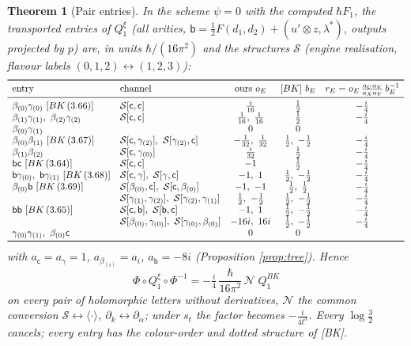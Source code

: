 \documentclass[11pt]{article}
\newtheorem{theorem}{Theorem}
\theoremstyle{definition}
\newcommand{\Qx}{Q^{\xi}}
\begin{document}
\begin{theorem}[Pair entries]\label{thm:main}
In the scheme $\psi=0$ with the computed $\hbar F_1$, the transported entries of $\Qx_1$ (all arities, $\mathsf b=\tfrac12F(d_1,d_2)+(u'\otimes z,\lambda^*)$, outputs projected by $p$) are, in units $\hbar/(16\pi^2)$ and the structures $\mathcal S$ (engine realisation, flavour labels $(0,1,2)\leftrightarrow(1,2,3)$):
\[
\begin{array}{llccc}
\toprule
\text{entry}&\text{channel}&\text{ours }o_E&[BK]\ b_E&r_E=o_E\,\frac{a_Ua_V}{a_Xa_Y}\,b_E^{-1}\\\midrule
\beta_{(0)}\gamma_{(0)}\ [BK\,(3.66)]&\mathcal S[\mathsf c,\mathsf c]&\tfrac i{16}&\tfrac12&-\tfrac i4\\
\beta_{(1)}\gamma_{(1)},\ \beta_{(2)}\gamma_{(2)}&\mathcal S[\mathsf c,\mathsf c]&\tfrac1{16},\ \tfrac1{16}&\tfrac12&-\tfrac i4\\
\beta_{(0)}\gamma_{(1)}&&0&0&\\
\beta_{(0)}\beta_{(1)}\ [BK\,(3.67)]&\mathcal S[\mathsf c,\gamma_{(2)}],\ \mathcal S[\gamma_{(2)},\mathsf c]&-\tfrac1{32},\ \tfrac1{32}&\tfrac12,\ -\tfrac12&-\tfrac i4\\
\beta_{(1)}\beta_{(2)}&\mathcal S[\mathsf c,\gamma_{(0)}]&\tfrac i{32}&\tfrac12&-\tfrac i4\\
\mathsf b\mathsf c\ [BK\,(3.64)]&\mathcal S[\mathsf c,\mathsf c]&-1&\tfrac12&-\tfrac i4\\
\mathsf b\gamma_{(0)},\ \mathsf b\gamma_{(1)}\ [BK\,(3.68)]&\mathcal S[\mathsf c,\gamma],\ \mathcal S[\gamma,\mathsf c]&-1,\ 1&\tfrac12,\ -\tfrac12&-\tfrac i4\\
\beta_{(0)}\mathsf b\ [BK\,(3.69)]&\mathcal S[\beta_{(0)},\mathsf c],\ \mathcal S[\mathsf c,\beta_{(0)}]&-1,\ -1&\tfrac12,\ \tfrac12&-\tfrac i4\\
&\mathcal S[\gamma_{(1)},\gamma_{(2)}],\ \mathcal S[\gamma_{(2)},\gamma_{(1)}]&\tfrac12,\ -\tfrac12&\tfrac12,\ -\tfrac12&-\tfrac i4\\
\mathsf b\mathsf b\ [BK\,(3.65)]&\mathcal S[\mathsf c,\mathsf b],\ \mathcal S[\mathsf b,\mathsf c]&-1,\ 1&\tfrac12,\ -\tfrac12&-\tfrac i4\\
&\mathcal S[\beta_{(0)},\gamma_{(0)}],\ \mathcal S[\gamma_{(0)},\beta_{(0)}]&-16i,\ 16i&\tfrac12,\ -\tfrac12&-\tfrac i4\\
\gamma_{(0)}\gamma_{(1)},\ \beta_{(0)}\mathsf c&&0&0&\\\bottomrule
\end{array}
\]
with $a_{\mathsf c}=a_\gamma=1$, $a_{\beta_{(i)}}=a_i$, $a_{\mathsf b}=-8i$ (Proposition \ref{prop:tree}). Hence
\[
\Phi\circ\Qx_1\circ\Phi^{-1}=-\tfrac i4\,\frac{\hbar}{16\pi^2}\,\mathcal N\;Q_1^{BK}
\]
on every pair of holomorphic letters without derivatives, $\mathcal N$ the common conversion $\mathcal S\leftrightarrow\langle\cdot\rangle$, $\partial_k\leftrightarrow\partial_{\dot\alpha}$; under $s_t$ the factor becomes $-\tfrac i{4t^3}$. Every $\log\tfrac32$ cancels; every entry has the colour-order and dotted structure of [BK].
\end{theorem}
\end{document}
